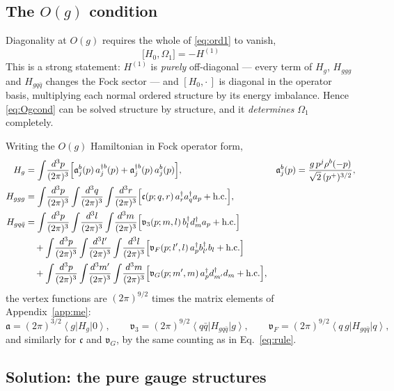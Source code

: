 \documentclass[11pt]{article}
\newcommand{\dg}{\dagger}
\newcommand{\ip}[1]{\int\!\frac{d^{3}#1}{(2\pi)^{3}}}
\newcommand{\ket}[1]{\left|#1\right\rangle}
\newcommand{\bra}[1]{\left\langle#1\right|}
\newcommand{\vac}{\ket{0}}
\newcommand{\OM}{\Omega}
\begin{document}
\subsection{The $O(g)$ condition}

Diagonality at $O(g)$ requires the whole of \eqref{eq:ord1} to vanish,
\begin{equation}
\boxed{\;\big[H_{0},\OM_{1}\big]=-H^{(1)}\;}
\label{eq:Ogcond}
\end{equation}
This is a strong statement: $H^{(1)}$ is \emph{purely} off-diagonal --- every term of
$H_{g}$, $H_{ggg}$ and $H_{gq\bar q}$ changes the Fock sector --- and $[H_{0},\cdot\,]$ is diagonal
in the operator basis, multiplying each normal ordered structure by its energy imbalance. Hence
\eqref{eq:Ogcond} can be solved structure by structure, and it \emph{determines} $\OM_{1}$
completely.

Writing the $O(g)$ Hamiltonian in Fock operator form,
\begin{align}
H_{g}&=\ip{p}\Big[\mathfrak a^{b}_{j}(p)\,a^{\dg b}_{j}(p)+\mathfrak a^{\dg b}_{j}(p)\,a^{b}_{j}(p)\Big],
&&\mathfrak a^{b}_{j}(p)=\frac{g\,p^{j}\rho^{b}(-p)}{\sqrt2\,(p^{+})^{3/2}},
\label{eq:Hgop}\\
H_{ggg}&=\ip{p}\ip{q}\ip{r}\Big[\mathfrak c(p;q,r)\,a^{\dg}_{r}a^{\dg}_{q}a_{p}+{\rm h.c.}\Big],
\\
H_{gq\bar q}&=\ip{p}\ip{l}\ip{m}\Big[\mathfrak v_{3}(p;m,l)\,b^{\dg}_{l}d^{\dg}_{m}a_{p}+{\rm h.c.}\Big]
\nonumber\\
&\quad+\ip{p}\ip{l'}\ip{l}\Big[\mathfrak v_{F}(p;l',l)\,a^{\dg}_{p}b^{\dg}_{l'}b_{l}+{\rm h.c.}\Big]
\nonumber\\
&\quad+\ip{p}\ip{m'}\ip{m}\Big[\mathfrak v_{G}(p;m',m)\,a^{\dg}_{p}d^{\dg}_{m'}d_{m}+{\rm h.c.}\Big],
\label{eq:Hqqgop}
\end{align}
the vertex functions are $(2\pi)^{9/2}$ times the matrix elements of Appendix~\ref{app:me}:
\begin{equation}
\mathfrak a=(2\pi)^{3/2}\bra{g}H_{g}\vac,\qquad
\mathfrak v_{3}=(2\pi)^{9/2}\bra{q\bar q}H_{gq\bar q}\ket{g},\qquad
\mathfrak v_{F}=(2\pi)^{9/2}\bra{q\,g}H_{gq\bar q}\ket{q},
\label{eq:vertexnorm}
\end{equation}
and similarly for $\mathfrak c$ and $\mathfrak v_{G}$, by the same counting as in
Eq.~\eqref{eq:rule}.

\subsection{Solution: the pure gauge structures}
\end{document}
